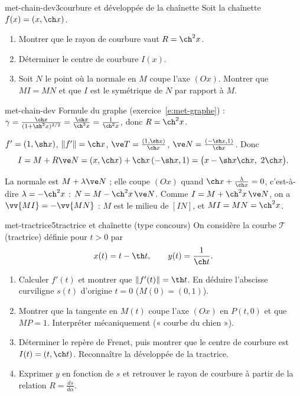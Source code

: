 \begin{exo}{met-chain-dev}{3}{courbure et développée de la chaînette}
Soit la chaînette $f(x)=(x,\ch x)$.
\begin{enumerate}
\item Montrer que le rayon de courbure vaut $R=\ch^2x$.
\item Déterminer le centre de courbure $I(x)$.
\item Soit $N$ le point où la normale en $M$ coupe l'axe $(Ox)$. Montrer que $MI=MN$ et que $I$ est le symétrique de $N$ par rapport à $M$.
\end{enumerate}
\end{exo}

\begin{corrige}{met-chain-dev}
 Formule du graphe (exercice~\ref{e:met-graphe}) : $\gamma=\frac{\ch x}{(1+\sh^2x)^{3/2}}=\frac{\ch x}{\ch^3x}=\frac1{\ch^2x}$, donc $R=\ch^2x$.

 $f'=(1,\sh x)$, $\|f'\|=\ch x$, $\ve T=\frac{(1,\sh x)}{\ch x}$, $\ve N=\frac{(-\sh x,1)}{\ch x}$. Donc
\[I=M+R\ve N=(x,\ch x)+\ch x\,(-\sh x,1)=\big(x-\sh x\ch x,\ 2\ch x\big).\]

 La normale est $M+\lambda\ve N$ ; elle coupe $(Ox)$ quand $\ch x+\frac{\lambda}{\ch x}=0$, c'est-à-dire $\lambda=-\ch^2x$ : $N=M-\ch^2x\,\ve N$. Comme $I=M+\ch^2x\,\ve N$, on a $\vv{MI}=-\vv{MN}$ : $M$ est le milieu de $[IN]$, et $MI=MN=\ch^2x$.
\end{corrige}

\begin{exo}{met-tractrice}{5}{tractrice et chaînette (type concours)}
On considère la courbe $\mathcal T$ (tractrice) définie pour $t>0$ par
\[x(t)=t-\th t,\qquad y(t)=\frac1{\ch t}.\]
\begin{enumerate}
\item Calculer $f'(t)$ et montrer que $\|f'(t)\|=\th t$. En déduire l'abscisse curviligne $s(t)$ d'origine $t=0$ ($M(0)=(0,1)$).
\item Montrer que la tangente en $M(t)$ coupe l'axe $(Ox)$ en $P(t,0)$ et que $MP=1$. Interpréter mécaniquement (« courbe du chien »).
\item Déterminer le repère de Frenet, puis montrer que le centre de courbure est $I(t)=(t,\ch t)$. Reconnaître la développée de la tractrice.
\item Exprimer $y$ en fonction de $s$ et retrouver le rayon de courbure à partir de la relation $R=\frac{ds}{d\alpha}$.
\end{enumerate}
\end{exo}

